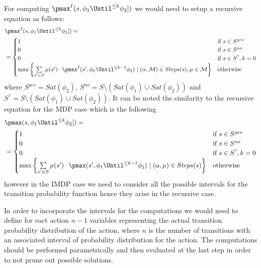 For computing $\pmax^I(s, \phi_1 \Until^{\le k} \phi_2])$ we would need to
setup a recursive equation as follows:
\begin{align*}
	 & \pmax^I(s, \phi_1 \Until^{\le k} \phi_2]) =                                                                                                  \\
	 & = \begin{cases}
		     1        & \text{if } s \in S^{yes}    \\
		     0        & \text{if } s \in S^{no}     \\
		     0        & \text{if } s \in S^?, k = 0 \\
		     \max \left\{
		     \sum\limits_{s' \in S} \mu(s')\cdot\pmax^I(s', \phi_1 \Until^{\le k-1} \phi_2) \mid (\alpha, \mathcal{M}) \in Steps(s), \mu \in \mathcal{M}
		     \right\} & \text{otherwise}
	     \end{cases}
\end{align*}
where $S^{yes} = Sat(\phi_2)$,
$S^{no} = S \setminus (Sat(\phi_1) \cup Sat(\phi_2))$ and
$S^? = S \setminus (Sat(\phi_1) \cup Sat(\phi_2))$.
It can be noted the similarity to the recursive equation for the MDP case which is the following
\begin{align*}
	 & \pmax(s, \phi_1 \Until^{\le k} \phi_2]) =                                                                     \\
	 & = \begin{cases}
		     1        & \text{if } s \in S^{yes}    \\
		     0        & \text{if } s \in S^{no}     \\
		     0        & \text{if } s \in S^?, k = 0 \\
		     \max \left\{
		     \sum\limits_{s' \in S} \mu(s')\cdot\pmax(s', \phi_1 \Until^{\le k-1} \phi_2) \mid (\alpha, \mu) \in Steps(s)
		     \right\} & \text{otherwise}
	     \end{cases}
\end{align*}
however in the IMDP case we need to consider all the possible intervals for the
transition probability function hence they arise in the recursive case.

In order to incorporate the intervals for the computations we would need to
define for eact action $n-1$ variables representing the actual transition
probability distribution of the action, where $n$ is the number of transitions
with an associated interval of probability distribution for the action.
The computations should be performed parametrically and then evaluated at the
last step in order to not prune out possible solutions.
